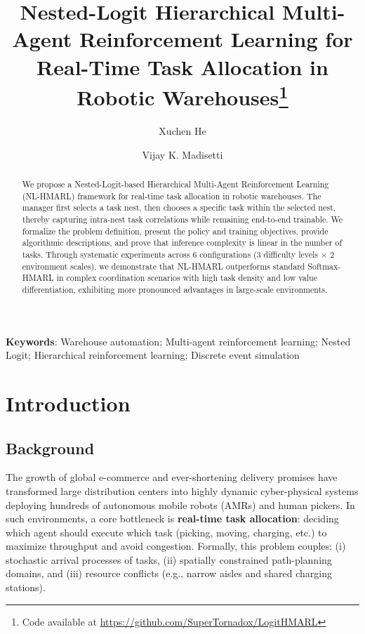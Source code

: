 \documentclass[12pt,a4paper]{article}
\begin{document}
\title{Nested-Logit Hierarchical Multi-Agent Reinforcement Learning for Real-Time Task Allocation in Robotic Warehouses\footnote{Code available at \url{https://github.com/SuperTornadox/LogitHMARL}}}
\author{Xuchen He \and Vijay K. Madisetti}
\date{}
\maketitle

\begin{abstract}
We propose a Nested-Logit-based Hierarchical Multi-Agent Reinforcement Learning (NL-HMARL) framework for real-time task allocation in robotic warehouses. The manager first selects a task nest, then chooses a specific task within the selected nest, thereby capturing intra-nest task correlations while remaining end-to-end trainable. We formalize the problem definition, present the policy and training objectives, provide algorithmic descriptions, and prove that inference complexity is linear in the number of tasks. Through systematic experiments across 6 configurations (3 difficulty levels $\times$ 2 environment scales), we demonstrate that NL-HMARL outperforms standard Softmax-HMARL in complex coordination scenarios with high task density and low value differentiation, exhibiting more pronounced advantages in large-scale environments.
\end{abstract}

\textbf{Keywords}: Warehouse automation; Multi-agent reinforcement learning; Nested Logit; Hierarchical reinforcement learning; Discrete event simulation

\section{Introduction}

\subsection{Background}

The growth of global e-commerce and ever-shortening delivery promises have transformed large distribution centers into highly dynamic cyber-physical systems deploying hundreds of autonomous mobile robots (AMRs) and human pickers. In such environments, a core bottleneck is \textbf{real-time task allocation}: deciding which agent should execute which task (picking, moving, charging, etc.) to maximize throughput and avoid congestion. Formally, this problem couples: (i) stochastic arrival processes of tasks, (ii) spatially constrained path-planning domains, and (iii) resource conflicts (e.g., narrow aisles and shared charging stations).
\end{document}
